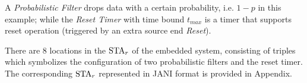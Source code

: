 \begin{example}
A \emph{Probabilistic Filter} drops data with a certain probability, i.e. $1 - p$ in this example; while
the \emph{Reset Timer} with time bound $t_{max}$ is a timer that supports reset operation (triggered by an extra source end \emph{Reset}). 

There are 8 locations in the $\mbox{STA}_r$ of the embedded system,
consisting of triples which symbolizes the configuration of
    two probabilistic filters and the reset timer.
The corresponding $\mbox{STA}_r$ represented in JANI format\cite{JaniSpec} is provided in Appendix.
\end{example}

%     

%     
